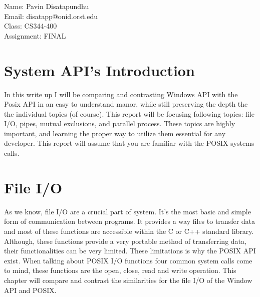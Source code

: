 \documentclass[a4paper]{article}
\begin{document}
\noindent
Name: Pavin Disatapundhu\\
Email: disatapp@onid.orst.edu\\
Class: CS344-400\\
Assignment: FINAL\\

\section{System API’s Introduction}
In this write up I will be comparing and contrasting Windows API with the Posix API in an easy to understand manor, while still preserving the depth the the individual topics (of course).  This report will be focusing following topics: file I/O, pipes, mutual exclusions, and parallel process. These topics are highly important, and learning the proper way to utilize them essential for any developer. This report will assume that you are familiar with the POSIX systems calls.
\section{File I/O}
As we know, file I/O are a crucial part of system.  It’s the most basic and simple form of communication between programs. It provides a way files to transfer data and most of these functions are accessible within the C or C++ standard library. Although, these functions provide a very portable method of transferring data, their functionalities can be very limited. These limitations is why the POSIX API exist. When talking about POSIX I/O functions four common system calls come to mind, these functions are the open, close, read and write operation. This chapter will compare and contrast the similarities for the file I/O of the Window API and POSIX. 
\end{document}
